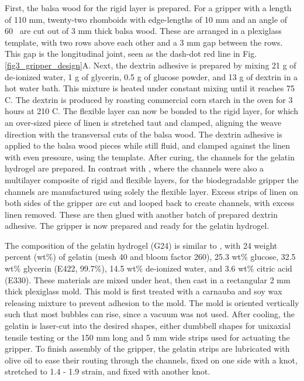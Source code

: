 First, the balsa wood for the rigid layer is prepared. For a gripper with a length of 110 mm, twenty-two rhomboids with edge-lengths of 10 mm and an angle of 60\degree~ are cut out of 3 mm thick balsa wood. These are arranged in a plexiglass template, with two rows above each other and a 3 mm gap between the rows. This gap is the longitudinal joint, seen as the dash-dot red line in Fig. \ref{fig3_gripper_design}A. Next, the dextrin adhesive is prepared by mixing 21 g of de-ionized water, 1 g of glycerin, 0.5 g of glucose powder, and 13 g of dextrin in a hot water bath. This mixture is heated under constant mixing until it reaches 75 \degree C. The dextrin is produced by roasting commercial corn starch in the oven for 3 hours at 210 \degree C. The flexible layer can now be bonded to the rigid layer, for which an over-sized piece of linen is stretched taut and clamped, aligning the weave direction with the transversal cuts of the balsa wood. The dextrin adhesive is applied to the balsa wood pieces while still fluid, and clamped against the linen with even pressure, using the template. After curing, the channels for the gelatin hydrogel are prepared. In contrast with \cite{Geckeler2022a}, where the channels were also a multilayer composite of rigid and flexible layers, for the biodegradable gripper the channels are manufactured using solely the flexible layer. Excess strips of linen on both sides of the gripper are cut and looped back to create channels, with excess linen removed. These are then glued with another batch of prepared dextrin adhesive. The gripper is now prepared and ready for the gelatin hydrogel.

The composition of the gelatin hydrogel (G24) is similar to \cite{Baumgartner2020}, with 24 weight percent (wt\%) of gelatin (mesh 40 and bloom factor 260), 25.3 wt\% glucose, 32.5 wt\% glycerin (E422, 99.7\%), 14.5 wt\% de-ionized water, and 3.6 wt\% citric acid (E330). These materials are mixed under heat, then cast in a rectangular 2 mm thick plexiglass mold. This mold is first treated with a carnauba and soy wax releasing mixture \cite{Baumgartner2020} to prevent adhesion to the mold. The mold is oriented vertically such that most bubbles can rise, since a vacuum was not used. After cooling, the gelatin is laser-cut into the desired shapes, either dumbbell shapes for unixaxial tensile testing or the 150 mm long and 5 mm wide strips used for actuating the gripper.
To finish assembly of the gripper, the gelatin strips are lubricated with olive oil to ease their routing through the channels, fixed on one side with a knot, stretched to 1.4 - 1.9 strain, and fixed with another knot.

